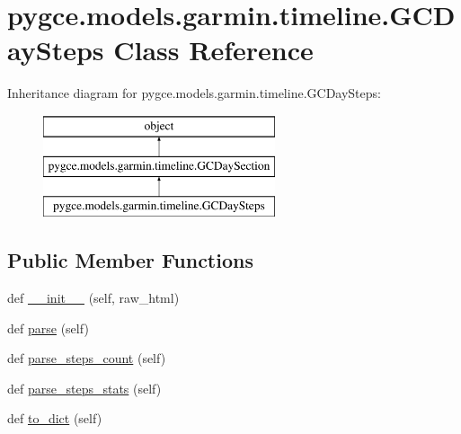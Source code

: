 \hypertarget{classpygce_1_1models_1_1garmin_1_1timeline_1_1_g_c_day_steps}{}\section{pygce.\+models.\+garmin.\+timeline.\+G\+C\+Day\+Steps Class Reference}
\label{classpygce_1_1models_1_1garmin_1_1timeline_1_1_g_c_day_steps}
Inheritance diagram for pygce.\+models.\+garmin.\+timeline.\+G\+C\+Day\+Steps\+:\begin{figure}[H]
\begin{center}
\leavevmode
\includegraphics[height=3.000000cm]{classpygce_1_1models_1_1garmin_1_1timeline_1_1_g_c_day_steps}
\end{center}
\end{figure}
\subsection*{Public Member Functions}
\begin{DoxyCompactItemize}
\item 
def \hyperlink{classpygce_1_1models_1_1garmin_1_1timeline_1_1_g_c_day_steps_a0b8cc0a273e2a35d5326b3e06c39e4a1}{\+\_\+\+\_\+init\+\_\+\+\_\+} (self, raw\+\_\+html)
\item 
def \hyperlink{classpygce_1_1models_1_1garmin_1_1timeline_1_1_g_c_day_steps_ae75ac9895d92ca73d95e451d92454f4e}{parse} (self)
\item 
def \hyperlink{classpygce_1_1models_1_1garmin_1_1timeline_1_1_g_c_day_steps_ab5fa162419e53f44464d5e0ce5d4a31f}{parse\+\_\+steps\+\_\+count} (self)
\item 
def \hyperlink{classpygce_1_1models_1_1garmin_1_1timeline_1_1_g_c_day_steps_a994d3d53c4f1eaa9729349d043e010f7}{parse\+\_\+steps\+\_\+stats} (self)
\item 
def \hyperlink{classpygce_1_1models_1_1garmin_1_1timeline_1_1_g_c_day_steps_ae464eda48e08d995c704199a73055e95}{to\+\_\+dict} (self)
\end{DoxyCompactItemize}
